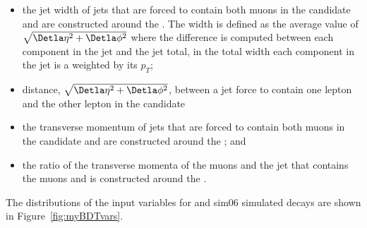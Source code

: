 \begin{itemize}
\item  the jet width of jets that are forced to contain both muons in the \bsmumu candidate and are constructed around the \bs. The width is defined as the average value of $\sqrt{\Detla \eta^2 + \Detla \phi^2}$ where the difference is computed between each component in the jet and the jet total, in the total width each component in the jet is a weighted by its $p_{T}$;
\item distance, $\sqrt{\Detla \eta^2 + \Detla \phi^2}$, between a jet force to contain one lepton and the other lepton in the \bsmumu candidate
\item the transverse momentum of jets that are forced to contain both muons in the \bsmumu candidate and are constructed around the \bs; and 
\item the ratio of the transverse momenta of the muons and the jet that contains the muons and is constructed around the \bs.
\end{itemize}

The distributions of the input variables for \bsmumu and  sim06 simulated decays are shown in Figure~\ref{fig:myBDTvars}.

